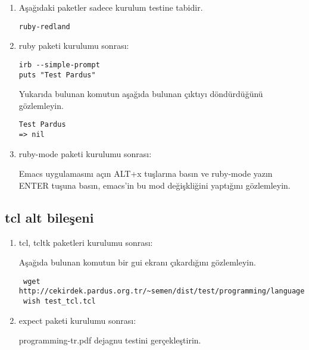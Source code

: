 \documentclass[a4paper,10pt]{article}
\begin{document}
\begin{enumerate}
\item Aşağıdaki paketler sadece kurulum testine tabidir.
\begin{verbatim}
ruby-redland
\end{verbatim}


 \item ruby paketi kurulumu sonrası:

\begin{verbatim}
irb --simple-prompt 
puts "Test Pardus"
\end{verbatim}

Yukarıda bulunan komutun aşağıda bulunan çıktıyı döndürdüğünü gözlemleyin.
\begin{verbatim}
Test Pardus
=> nil
\end{verbatim}

\item ruby-mode paketi kurulumu sonrası:

Emacs uygulamasını açın ALT+x tuşlarına basın ve ruby-mode yazın ENTER tuşuna basın, emacs'in bu mod değişkliğini yaptığını gözlemleyin.
\end{enumerate}

\subsection{tcl alt bileşeni}

\begin{enumerate}
 \item tcl, tcltk paketleri kurulumu sonrası:

Aşağıda bulunan komutun bir gui ekranı çıkardığını gözlemleyin.
\begin{verbatim}
 wget http://cekirdek.pardus.org.tr/~semen/dist/test/programming/language/test_tcl.tcl
 wish test_tcl.tcl
\end{verbatim}

\item expect paketi kurulumu sonrası:

programming-tr.pdf dejagnu testini gerçekleştirin.
\end{enumerate}
\end{document}
